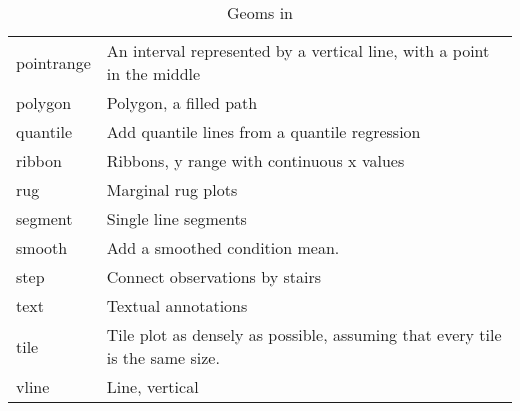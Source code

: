 \begin{table}
\begin{center}
\begin{tabular}{lp{3in}}
  pointrange   & An interval represented by a vertical line, with a point in the middle       \\
  polygon      & Polygon, a filled path                                                       \\
  quantile     & Add quantile lines from a quantile regression                                \\
  ribbon       & Ribbons, y range with continuous x values                                    \\
  rug          & Marginal rug plots                                                           \\
  segment      & Single line segments                                                         \\
  smooth       & Add a smoothed condition mean.                                               \\
  step         & Connect observations by stairs                                               \\
  text         & Textual annotations                                                          \\
  tile         & Tile plot as densely as possible, assuming that every tile is the same size. \\
  vline        & Line, vertical                                                               \\

  \bottomrule
  \end{tabular}
  \end{center}
  \caption{Geoms in \ggplot}
  \label{tbl:geoms}
\end{table}

